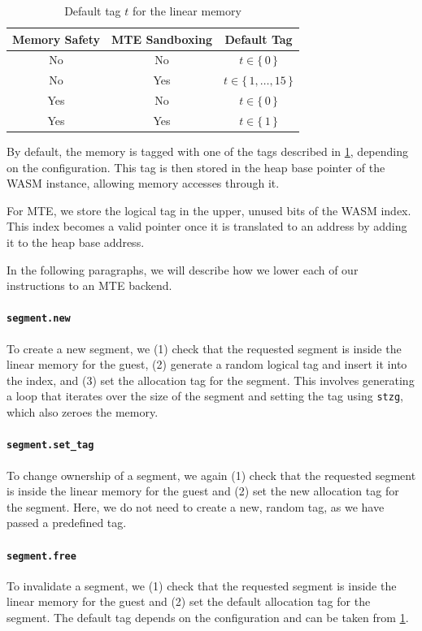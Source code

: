 \begin{table}
  \centering
  \begin{tabular}{c | c || c}
    \textbf{Memory Safety} & \textbf{MTE Sandboxing} & \textbf{Default Tag} \\
    \hline
    No  & No  & $t \in \{\,0\,\}$ \\
    No  & Yes & $t \in \{\,1, \dots, 15\,\}$ \\
    Yes & No  & $t \in \{\,0\,\}$ \\
    Yes & Yes & $t \in \{\,1\,\}$
  \end{tabular}
  \caption{Default tag $t$ for the linear memory}
  \label{tab:default-tag}
\end{table}

By default, the memory is tagged with one of the tags described in \cref{tab:default-tag}, depending on the configuration.
This tag is then stored in the heap base pointer of the \ac{WASM} instance, allowing memory accesses through it.

For \ac{MTE}, we store the logical tag in the upper, unused bits of the \ac{WASM} index.
This index becomes a valid pointer once it is translated to an address by adding it to the heap base address.

In the following paragraphs, we will describe how we lower each of our instructions to an \ac{MTE} backend.

\paragraph{\texttt{segment.new}} To create a new segment, we (1) check that the requested segment is inside the linear memory for the guest, (2) generate a random logical tag and insert it into the index, and (3) set the allocation tag for the segment.
This involves generating a loop that iterates over the size of the segment and setting the tag using \texttt{stzg}, which also zeroes the memory.

\paragraph{\texttt{segment.set\_tag}} To change ownership of a segment, we again (1) check that the requested segment is inside the linear memory for the guest and (2) set the new allocation tag for the segment.
Here, we do not need to create a new, random tag, as we have passed a predefined tag.

\paragraph{\texttt{segment.free}} To invalidate a segment, we (1) check that the requested segment is inside the linear memory for the guest and (2) set the default allocation tag for the segment.
The default tag depends on the configuration and can be taken from \cref{tab:default-tag}.


